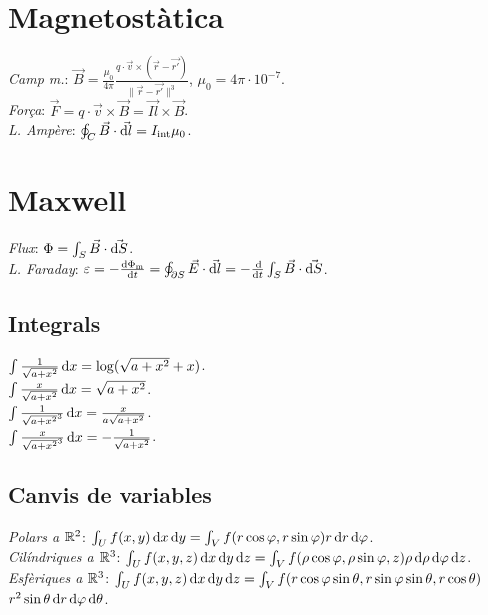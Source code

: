 \section{Magnetostàtica}
\emph{Camp m.}: $\vec{B} = \frac{\mu_0}{4\pi}\frac{q\cdot \vec{v}\times (\vec{r} - \vec{r'})}{\|\vec{r} -\vec{r'}\|^3}$, $\mu_0=4\pi \cdot 10^{-7}$. \\
\emph{Força}: $\vec{F} = q \cdot\vec{v}\times\vec{B} = \vec{Il} \times \vec{B}$. \\
\emph{L. Ampère}: $\oint_C \vec{B}\cdot \vec{\dif l} = I_{\text{int}} \mu_0$.

\section{Maxwell}
\emph{Flux}: $\Phi = \int_S \vec{B}\cdot \vec{\dif S}$. \\
\emph{L. Faraday}: $\varepsilon = -\frac{\dif \Phi_{\text{m}}}{\dif t}=\oint_{\partial S} \vec{E} \cdot \vec{\dif l} = -\frac{\dif}{\dif t}\int_S \vec{B} \cdot \vec{\dif S}$.

\addtocounter{section}{1}
\noindent\makebox[\linewidth]{\rule{\linewidth}{0.5pt}}

\subsection{Integrals}
\ci $\int \frac{1}{\sqrt{a+x^2}}\dif x = \log (\sqrt{a+x^2} + x)$. \\
\ci $\int \frac{x}{\sqrt{a+x^2}}\dif x = \sqrt{a+x^2}$. \\
\ci $\int \frac{1}{\sqrt{a+x^2}^3}\dif x = \frac{x}{a\sqrt{a+x^2}}$. \\
\ci $\int \frac{x}{\sqrt{a+x^2}^3}\dif x = -\frac{1}{\sqrt{a+x^2}}$.

\subsection{Canvis de variables}
\emph{Polars a $\mathbb{R}^2$}: $\int_U f( x,y ) \dif x\dif y = \int_V f( r\cos\varphi, r\sin\varphi )r \dif r\dif \varphi$. \\
\emph{Cilíndriques a $\mathbb{R}^3$}: $\int_U f( x,y,z ) \dif x\dif y\dif z = \int_V f( \rho\cos\varphi, \rho\sin\varphi, z )\rho \dif \rho\dif \varphi\dif z$. \\
\emph{Esfèriques a $\mathbb{R}^3$}: $\int_U f( x,y,z ) \dif x\dif y\dif z = \int_V f ( r\cos\varphi\sin\theta, r\sin\varphi\sin\theta, r\cos\theta )$ $r^2\sin\theta \dif r\dif \varphi\dif \theta$.

